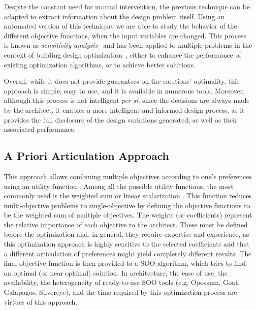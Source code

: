 	Despite the constant need for manual intervention, the previous technique can be adapted to extract information about the design problem itself. Using an automated version of this technique, we are able to study the behavior of the different objective functions, when the input variables are changed. This process is known as \textit{sensitivity analysis}~\cite{Saltelli2007} and has been applied to multiple problems in the context of building design optimization~\cite{Tian2013}, either to enhance the performance of existing optimization algorithms, or to achieve better solutions.

	Overall, while it does not provide guarantees on the solutions’ optimality, this approach is simple, easy to use, and it is available in numerous tools. Moreover, although this process is not intelligent \textit{per si}, since the decisions are always made by the architect, it enables a more intelligent and informed design process, as it provides the full disclosure of the design variations generated, as well as their associated performance.

\subsection{A Priori Articulation Approach}

	This approach allows combining multiple objectives according to one’s preferences using an utility function \cite{Marler2004}. Among all the possible utility functions, the most commonly used is the weighted sum or linear scalarization \cite{Wortmann2017Opossum}. This function reduces multi-objective problems to single-objective by defining the objective functions to be the weighted sum of multiple objectives. The weights (or coefficients) represent the relative importance of each objective to the architect. These must be defined before
the optimization and, in general, they require expertise and experience, as this optimization approach is highly sensitive to the selected coefficients and that a different articulation of preferences might yield completely different results. The
final objective function is then provided to a \ac{SOO} algorithm, which tries to find an optimal (or near optimal) solution. In architecture, the ease of use, the availability,
the heterogeneity of ready-to-use \ac{SOO} tools (e.g. Opossum, Goat, Galapagos, Silvereye), and the time required by this optimization process are virtues of this approach.

